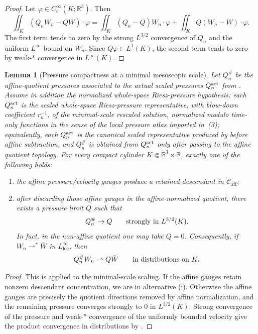 \documentclass[11pt]{amsart}
\numberwithin{equation}{section}
\theoremstyle{plain}
\newtheorem{lemma}[lemma]{Lemma}
\theoremstyle{definition}
\theoremstyle{remark}
\newcommand{\loc}{\mathrm{loc}}
\newcommand{\Caff}{\mathcal C_{\mathrm{aff}}}
\begin{document}
\begin{proof}
Let \(\varphi\in C_c^\infty(K;\mathbb R^3)\).  Then
\[
   \iint_K (Q_nW_n-QW)\cdot\varphi
   =
   \iint_K (Q_n-Q)W_n\cdot\varphi
   +\iint_K Q(W_n-W)\cdot\varphi .
\]
The first term tends to zero by the strong \(L^{3/2}\) convergence of \(Q_n\)
and the uniform \(L^\infty\) bound on \(W_n\).  Since \(Q\varphi\in L^1(K)\),
the second term tends to zero by weak-* convergence in \(L^\infty(K)\).
\end{proof}

\begin{lemma}[Pressure compactness at a minimal mesoscopic scale]
\label{lem:first-bad-pressure-compactness}
Let \(Q_n^\#\) be the affine-quotient pressures associated to the actual scaled
pressures \(Q_n^{\rm act}\) from .  Assume in
addition the \emph{normalized whole-space Riesz-pressure hypothesis}: each
\(Q_n^{\rm act}\) is the scaled whole-space Riesz-pressure representative, with
blow-down coefficient \(r_n^{-1}\), of the minimal-scale rescaled solution,
normalized modulo time-only functions in the sense of the local pressure atlas
imported in \,(3); equivalently, each
\(Q_n^{\rm act}\) is the canonical scaled representative produced by
 before affine subtraction, and
\(Q_n^\#\) is obtained from \(Q_n^{\rm act}\) only after passing to the affine
quotient topology.
For every compact cylinder \(K\Subset\mathbb R^3\times\mathbb R\), exactly
one of the following holds:
\begin{enumerate}[label=\textup{(\roman*)}]
   \item the affine pressure/velocity gauges produce a retained descendant in
   \(\Caff\);
   \item after discarding those affine gauges in the affine-normalized quotient,
   there exists a pressure limit \(Q\) such that
\[
   Q_n^\#\to Q
   \qquad\hbox{strongly in }L^{3/2}(K).
\]
   In fact, in the non-affine quotient one may take \(Q=0\).  Consequently, if
   \(W_n\rightharpoonup^\ast \bar W\) in \(L^\infty_{\loc}\), then
\[
   Q_n^\#W_n\rightharpoonup Q\bar W
   \qquad\hbox{in distributions on }K .
\]
\end{enumerate}
\end{lemma}

\begin{proof}
This is  applied to the
minimal-scale scaling.  If the affine gauges retain nonzero descendant concentration,
we are in alternative \textup{(i)}.  Otherwise the affine gauges are precisely
the quotient directions removed by affine normalization, and the remaining
pressure converges strongly to \(0\) in \(L^{3/2}(K)\).  Strong convergence of
the pressure and weak-* convergence of the uniformly bounded velocity give the
product convergence in distributions by
.
\end{proof}
\end{document}
